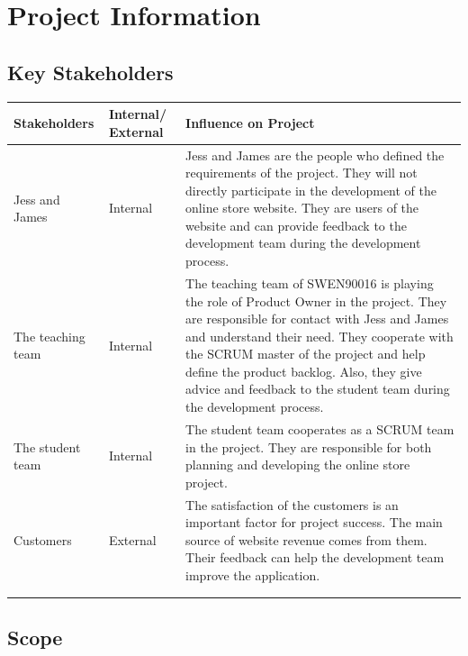 \documentclass{report}
\begin{document}
\chapter{Project Information}
\section{Key Stakeholders}
\begin{tabularx}{0.95\linewidth}{%
  >{\raggedright\arraybackslash}l%
  >{\raggedright\arraybackslash}p{1.5cm}%
  >{\raggedright\arraybackslash}X}
  \toprule
  Stakeholders & Internal/ External & Influence on Project \\
  \midrule
  Jess and James
  & Internal
  & Jess and James are the people who defined the requirements of the project. They will not directly participate in the development of the online store website. They are users of the website and can provide feedback to the development team during the development process.
  \\
  \midrule
  The teaching team
  & Internal
  & The teaching team of SWEN90016 is playing the role of Product Owner in the project. They are responsible for contact with Jess and James and understand their need.  They cooperate with the SCRUM master of the project and help define the product backlog. Also, they give advice and feedback to the student team during the development process.
  \\
  \midrule
  The student team
  & Internal
  & The student team cooperates as a SCRUM team in the project. They are responsible for both planning and developing the online store project. 
  \\
  \midrule
  Customers
  & External
  & The satisfaction of the customers is an important factor for project success. The main source of website revenue comes from them. Their feedback can help the development team improve the application.
  \\
  \bottomrule
  \\
  \caption{Stakeholder Register}  
  \label{tab:stakeholderRegister}
\end{tabularx}

\section{Scope}
\end{document}
